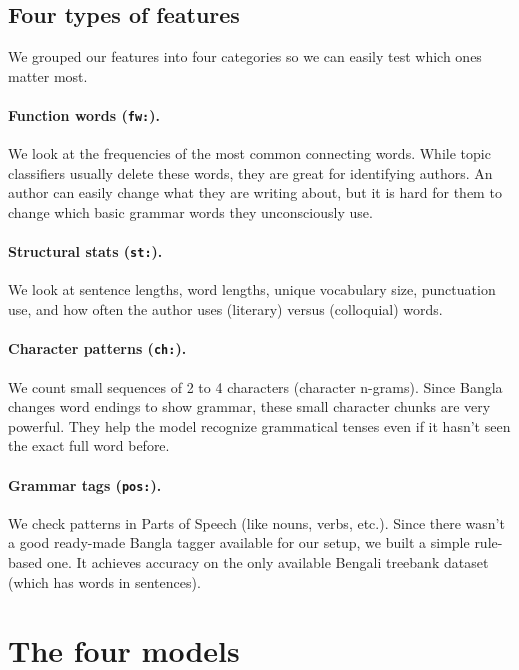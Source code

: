 \subsection{Four types of features}

We grouped our features into four categories so we can easily test which ones matter most.

\paragraph{Function words (\texttt{fw:}).} We look at the frequencies of the \TopFunctionWords{} most common connecting words. While topic classifiers usually delete these words, they are great for identifying authors. An author can easily change what they are writing about, but it is hard for them to change which basic grammar words they unconsciously use.

\paragraph{Structural stats (\texttt{st:}).} We look at sentence lengths, word lengths, unique vocabulary size, punctuation use, and how often the author uses  (literary) versus  (colloquial) words.

\paragraph{Character patterns (\texttt{ch:}).} We count small sequences of 2 to 4 characters (character n-grams). Since Bangla changes word endings to show grammar, these small character chunks are very powerful. They help the model recognize grammatical tenses even if it hasn't seen the exact full word before.

\paragraph{Grammar tags (\texttt{pos:}).} We check patterns in Parts of Speech (like nouns, verbs, etc.). Since there wasn't a good ready-made Bangla tagger available for our setup, we built a simple rule-based one. It achieves \posAcc{} accuracy on the only available Bengali treebank dataset (which has \posTokens{} words in \posSentences{} sentences).

\section{The four models}
\label{sec:models}

